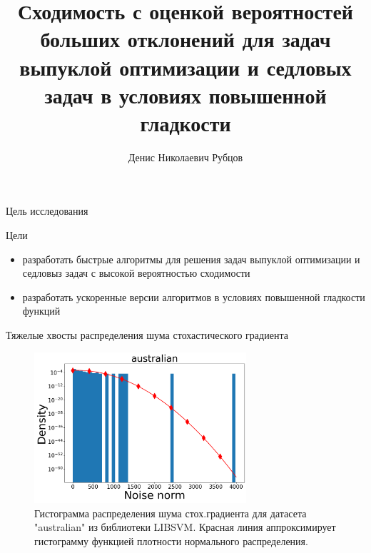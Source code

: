 \documentclass{beamer}
\title[\hbox to 56mm]{Сходимость с оценкой вероятностей больших отклонений для задач выпуклой оптимизации и седловых задач в условиях повышенной гладкости}
\author[Д.\,Н. Рубцов]{Денис Николаевич Рубцов}
\institute{Московский физико-технический институт}
\date{\footnotesize
\par\smallskip\emph{Научный руководитель:} д.ф.-м.н. А.\,В.~Гасников

\par\bigskip\small 2024}
\begin{document}
\begin{frame}
\thispagestyle{empty}
\maketitle
\end{frame}
\begin{frame}{Цель исследования}
     \begin{block}{Цели}
     \begin{itemize}
         \item разработать быстрые алгоритмы для решения задач выпуклой оптимизации и седловыз задач с высокой вероятностью сходимости
         \item разработать ускоренные версии алгоритмов в условиях повышенной гладкости функций
     \end{itemize}
     \end{block}

 \end{frame}

 \begin{frame}{Тяжелые хвосты распределения шума стохастического градиента}

\begin{figure}
\caption*{ Гистограмма распределения шума стох.градиента для датасета "australian" из библиотеки LIBSVM. Красная линия аппроксимирует гистограмму функцией плотности нормального распределения. }
\includegraphics[width=0.7\textwidth]{australian_heavy_tails.png}
\end{figure}
\end{frame}
\end{document}
